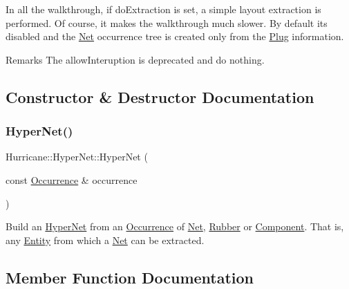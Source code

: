 In all the walkthrough, if {\ttfamily do\+Extraction} is set, a simple layout extraction is performed. Of course, it makes the walkthrough much slower. By default it\textquotesingle{}s disabled and the \mbox{\hyperlink{classHurricane_1_1Net}{Net}} occurrence tree is created only from the \mbox{\hyperlink{classHurricane_1_1Plug}{Plug}} information.

\begin{DoxyRemark}{Remarks}
The {\ttfamily allow\+Interuption} is deprecated and do nothing. 
\end{DoxyRemark}


\subsection{Constructor \& Destructor Documentation}
\mbox{\label{classHurricane_1_1HyperNet_a30bdc04b4dece8bdef66361fe4469175}} 
\subsubsection{\texorpdfstring{Hyper\+Net()}{HyperNet()}}
{\footnotesize\ttfamily Hurricane\+::\+Hyper\+Net\+::\+Hyper\+Net (\begin{DoxyParamCaption}\item[{const \mbox{\hyperlink{classHurricane_1_1Occurrence}{Occurrence}} \&}]{occurrence }\end{DoxyParamCaption})}

Build an \mbox{\hyperlink{classHurricane_1_1HyperNet}{Hyper\+Net}} from an \mbox{\hyperlink{classHurricane_1_1Occurrence}{Occurrence}} of \mbox{\hyperlink{classHurricane_1_1Net}{Net}}, \mbox{\hyperlink{classHurricane_1_1Rubber}{Rubber}} or \mbox{\hyperlink{classHurricane_1_1Component}{Component}}. That is, any \mbox{\hyperlink{classHurricane_1_1Entity}{Entity}} from which a \mbox{\hyperlink{classHurricane_1_1Net}{Net}} can be extracted. 

\subsection{Member Function Documentation}
\mbox{\label{classHurricane_1_1HyperNet_a327eab6dda243836becde745bfc53efa}} 
